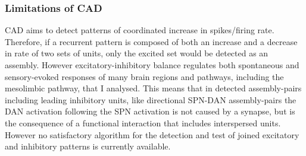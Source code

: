 \subsubsection{Limitations of CAD}
CAD aims to detect patterns of coordinated increase in spikes/firing rate. Therefore, if a recurrent pattern is composed of both an increase and a decrease in rate of two sets of units, only the excited set would be detected as an assembly. However excitatory-inhibitory balance regulates both spontaneous and sensory-evoked responses of many brain regions and pathways, including the mesolimbic pathway, that I analysed. This means that in detected assembly-pairs including leading inhibitory units, like directional SPN-DAN assembly-pairs the DAN activation following the SPN activation is not caused by a synapse, but is the consequence of a functional interaction that includes interspersed units. However no satisfactory algorithm for the detection and test of joined excitatory and inhibitory patterns is currently available.
